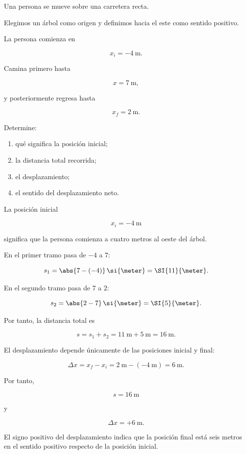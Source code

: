 \begin{ejemplo}
Una persona se mueve sobre una carretera recta.

Elegimos un árbol como origen y definimos hacia el este como sentido
positivo.

La persona comienza en

\[ x_i=-\SI{4}{\meter}. \]

Camina primero hasta

\[ x=\SI{7}{\meter}, \]

y posteriormente regresa hasta

\[ x_f=\SI{2}{\meter}. \]

Determine:

\begin{enumerate}[label=\alph*)]
    \item qué significa la posición inicial;
    \item la distancia total recorrida;
    \item el desplazamiento;
    \item el sentido del desplazamiento neto.
\end{enumerate}
\end{ejemplo}

La posición inicial

\[ x_i=-\SI{4}{\meter} \]

significa que la persona comienza a cuatro metros al oeste del árbol.

En el primer tramo pasa de \(-4\) a \(7\):

\[
s_1=\abs{7-(-4)}\,\si{\meter}
=\SI{11}{\meter}.
\]

En el segundo tramo pasa de \(7\) a \(2\):

\[
s_2=\abs{2-7}\,\si{\meter}
=\SI{5}{\meter}.
\]

Por tanto, la distancia total es

\[
s=s_1+s_2
=\SI{11}{\meter}+\SI{5}{\meter}
=\SI{16}{\meter}.
\]

El desplazamiento depende únicamente de las posiciones inicial y final:

\[
\Delta x=x_f-x_i
=\SI{2}{\meter}-(-\SI{4}{\meter})
=\SI{6}{\meter}.
\]

Por tanto,

\[ \boxed{s=\SI{16}{\meter}} \]

y

\[ \boxed{\Delta x=+\SI{6}{\meter}}. \]

El signo positivo del desplazamiento indica que la posición final está seis
metros en el sentido positivo respecto de la posición inicial.

